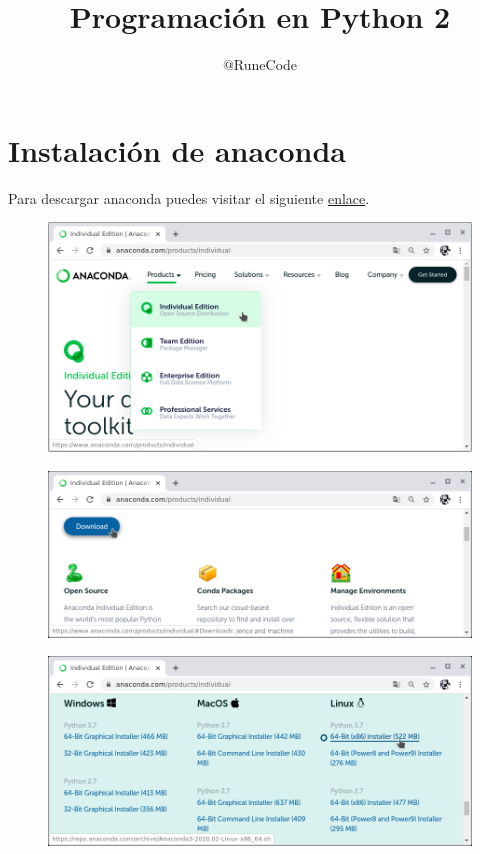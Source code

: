 \documentclass{article}
\title{Programación en Python 2}
\author{@RuneCode}
\begin{document}


\section*{Instalación de anaconda}%

Para descargar anaconda puedes visitar el siguiente
\href{https://www.anaconda.com/}{enlace}.

\begin{figure}[h!]
  \centering
  \includegraphics[scale=0.75]{./Pictures/001_install_anaconda.png}
\end{figure}

\begin{figure}[h!]
  \centering
  \includegraphics[scale=0.75]{./Pictures/001_download_anaconda.png}
\end{figure}

\newpage

\begin{figure}[h!]
  \centering
  \includegraphics[scale=0.75]{./Pictures/002_download_anaconda.png}
\end{figure}
\end{document}
